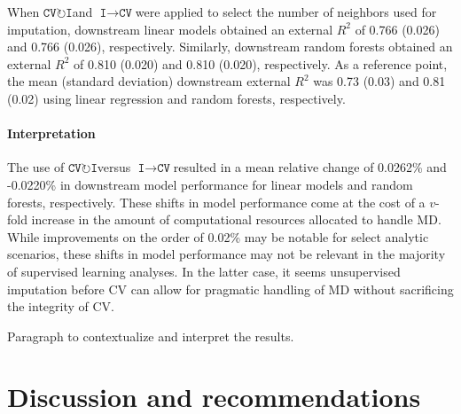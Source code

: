 \documentclass[AMA,STIX1COL,doublespace]{WileyNJD-v2}
\begin{document}
When $\texttt{CV}\!\circlearrowright\!\texttt{I}$\space and
$\texttt{I}\!\!\rightarrow\!\texttt{CV}$\space were applied to select
the number of neighbors used for imputation, downstream linear models
obtained an external \(R^2\) of 0.766 (0.026) and 0.766 (0.026),
respectively. Similarly, downstream random forests obtained an external
\(R^2\) of 0.810 (0.020) and 0.810 (0.020), respectively. As a reference
point, the mean (standard deviation) downstream external \(R^2\) was
0.73 (0.03) and 0.81 (0.02) using linear regression and random forests,
respectively.

\paragraph{Interpretation}

The use of $\texttt{CV}\!\circlearrowright\!\texttt{I}$\space versus
$\texttt{I}\!\!\rightarrow\!\texttt{CV}$\space resulted in a mean
relative change of 0.0262\% and -0.0220\% in downstream model
performance for linear models and random forests, respectively. These
shifts in model performance come at the cost of a \(v\)-fold increase in
the amount of computational resources allocated to handle MD. While
improvements on the order of 0.02\% may be notable for select analytic
scenarios, these shifts in model performance may not be relevant in the
majority of supervised learning analyses. In the latter case, it seems
unsupervised imputation before CV can allow for pragmatic handling of MD
without sacrificing the integrity of CV.

Paragraph to contextualize and interpret the results.

\section{Discussion and recommendations} \label{sec:discuss}
\end{document}
